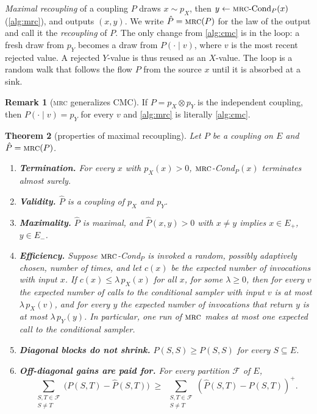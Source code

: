 \documentclass[11pt]{article}
\newtheorem{theorem}{Theorem}[section]
\theoremstyle{definition}
\newtheorem{remark}[theorem]{Remark}
\newcommand{\pX}{p_X}
\newcommand{\pY}{p_Y}
\newcommand{\hP}{\hat P}
\newcommand{\Ep}{E_{+}}
\newcommand{\Em}{E_{-}}
\newcommand{\pos}[1]{\left(#1\right)^{+}}
\newcommand{\MRC}{\textnormal{\textsc{mrc}}}
\newcommand{\F}{\mathcal{F}}
\begin{document}
\emph{Maximal recoupling} of a coupling $P$ draws $x\sim\pX$, then
$y\gets\MRC\text{-Cond}_P(x)$ (\cref{alg:mrc}), and outputs $(x,y)$. We write
$\hP=\MRC(P)$ for the law of the output and call it the \emph{recoupling} of $P$.
The only change from \cref{alg:cmc} is in the loop: a fresh draw from $\pY$
becomes a draw from $P(\cdot\mid v)$, where $v$ is the most recent rejected
value. A rejected $Y$-value is thus reused as an $X$-value. The loop is a random
walk that follows the flow $P$ from the source $x$ until it is absorbed at a
sink.

\begin{remark}[\MRC{} generalizes CMC]\label{rem:cmc}
If $P=\pX\otimes\pY$ is the independent coupling, then $P(\cdot\mid v)=\pY$ for
every $v$ and \cref{alg:mrc} is literally \cref{alg:cmc}.
\end{remark}

\begin{theorem}[properties of maximal recoupling]\label{thm:mrc}
Let $P$ be a coupling on $E$ and $\hP=\MRC(P)$.
\begin{enumerate}[label=(\alph*)]
  \item\label{it:term} \textbf{Termination.} For every $x$ with $\pX(x)>0$,
  $\MRC$-Cond$_P(x)$ terminates almost surely.
  \item\label{it:coupling} \textbf{Validity.} $\hP$ is a coupling of $\pX$ and $\pY$.
  \item\label{it:max} \textbf{Maximality.} $\hP$ is maximal, and $\hP(x,y)>0$ with $x\neq y$ implies $x\in\Ep$, $y\in\Em$.
  \item\label{it:eff} \textbf{Efficiency.} Suppose $\MRC$-Cond$_P$ is invoked
  a random, possibly adaptively chosen, number of times, and let $c(x)$ be the
  expected number of invocations with input $x$. If $c(x)\le\lambda\,\pX(x)$
  for all $x$, for some $\lambda\ge 0$, then for every $v$ the expected number
  of calls to the conditional sampler with input $v$ is at most
  $\lambda\,\pX(v)$, and for every $y$ the expected number of invocations that
  return $y$ is at most $\lambda\,\pY(y)$. In particular, one run of $\MRC$
  makes at most one expected call to the conditional sampler.
  \item\label{it:diag} \textbf{Diagonal blocks do not shrink.} $\hP(S,S)\ge P(S,S)$ for every $S\subseteq E$.
  \item\label{it:comp} \textbf{Off-diagonal gains are paid for.} For every partition $\F$ of $E$,
  \[
    \sum_{\substack{S,T\in\F\\ S\neq T}}\bigl(P(S,T)-\hP(S,T)\bigr)
    \;\ge\;
    \sum_{\substack{S,T\in\F\\ S\neq T}}\pos{\hP(S,T)-P(S,T)}.
  \]
\end{enumerate}
\end{theorem}
\end{document}
